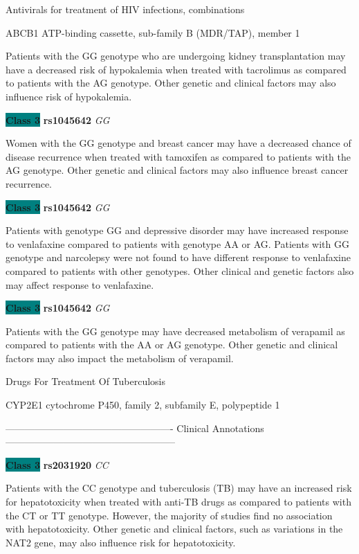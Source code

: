\documentclass{resume} %
\begin{document}
\begin{rSection}{ Antivirals for treatment of HIV infections, combinations }
\begin{rSubsection}{ ABCB1 }{ ATP-binding cassette, sub-family B (MDR/TAP), member 1 }{}{}
\item[] Patients with the GG genotype who are undergoing kidney transplantation may have a decreased risk of hypokalemia when treated with tacrolimus as compared to patients with the AG genotype. Other genetic and clinical factors may also influence risk of hypokalemia.\item \textbf{\colorbox{teal} {Class 3}} \textbf{ rs1045642 } \textit{ GG }
\item[] Women with the GG genotype and breast cancer may have a decreased chance of disease recurrence when treated with tamoxifen as compared to patients with the AG genotype. Other genetic and clinical factors may also influence breast cancer recurrence.\item \textbf{\colorbox{teal} {Class 3}} \textbf{ rs1045642 } \textit{ GG }
\item[] Patients with genotype GG and depressive disorder may have increased response to venlafaxine compared to patients with genotype AA or AG. Patients with GG genotype and narcolepsy were not found to have different response to venlafaxine compared to patients with other genotypes. Other clinical and genetic factors also may affect response to venlafaxine.\item \textbf{\colorbox{teal} {Class 3}} \textbf{ rs1045642 } \textit{ GG }
\item[] Patients with the GG genotype may have decreased metabolism of verapamil as compared to patients with the AA or AG genotype. Other genetic and clinical factors may also impact the metabolism of verapamil.
\end{rSubsection}

\end{rSection}\begin{rSection}{ Drugs For Treatment Of Tuberculosis }
\item[]

\begin{rSubsection}{ CYP2E1 }{ cytochrome P450, family 2, subfamily E, polypeptide 1 }{}{}
\item[]

\item[] ---------------------------------------------------- Clinical Annotations -----------------------------------------------------\newline
\item \textbf{\colorbox{teal} {Class 3}} \textbf{ rs2031920 } \textit{ CC }
\item[] Patients with the CC genotype and tuberculosis (TB) may have an increased risk for hepatotoxicity when treated with anti-TB drugs as compared to patients with the CT or TT genotype. However, the majority of studies find no association with hepatotoxicity. Other genetic and clinical factors, such as variations in the NAT2 gene, may also influence risk for hepatotoxicity.
\end{rSubsection}


\end{rSection}
\end{document}
